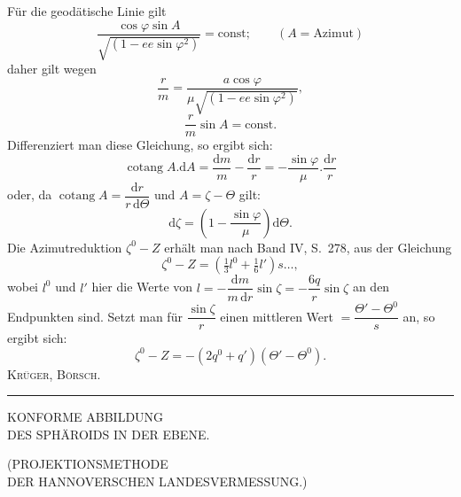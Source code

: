Für die geodätische Linie gilt
\[
\frac{\cos\varphi\sin A}{\sqrt{(1-ee\sin\varphi^2)}}=\text{const};\qquad(A=\text{Azimut})
\]
daher gilt wegen
\[
\frac rm=\frac{a\cos\varphi}{\mu\sqrt{(1-ee\sin\varphi^2)}},
\]
\[
\frac rm\sin A=\text{const.}
\]
Differenziert man diese Gleichung, so ergibt sich:
\[
\operatorname{cotang}A.\mathrm dA=\frac{\mathrm dm}{m}-\frac{\mathrm dr}{r}=-\frac{\sin\varphi}{\mu}.\frac{\mathrm dr}{r}
\]
oder, da $\operatorname{cotang}A=\dfrac{\mathrm dr}{r\,\mathrm d\Theta}$ und $A=\zeta-\Theta$ gilt:
\[
\mathrm d\zeta=\left(1-\frac{\sin\varphi}{\mu}\right)\mathrm d\Theta.
\]
Die Azimutreduktion $\zeta^0-Z$ erhält man nach Band IV, S.~278, aus der Gleichung
\[
\zeta^0-Z=(\tfrac13l^0+\tfrac16l')s\ldots,
\]
wobei $l^0$ und $l'$ hier die Werte von $l=-\dfrac{\mathrm dm}{m\,\mathrm dr}\sin\zeta=-\dfrac{6q}{r}\sin\zeta$ an den Endpunkten sind. Setzt man für $\dfrac{\sin\zeta}{r}$ einen mittleren Wert $=\dfrac{\Theta'-\Theta^0}{s}$ an, so ergibt sich:
\[
\zeta^0-Z=-(2q^0+q')(\Theta'-\Theta^0).
\]
\hfill\textsc{Krüger, Börsch.}\par
\par\endgroup
\vfill\begin{center}\rule{.24\textwidth}{.4pt}\end{center}
\clearpage
\null\vfill
\begin{center}
{\LARGE KONFORME ABBILDUNG\\[8pt]DES SPHÄROIDS IN DER EBENE.}\par\bigskip
{\Large (PROJEKTIONSMETHODE\\DER HANNOVERSCHEN LANDESVERMESSUNG.)}
\end{center}
\vfill\null
\endgroup
